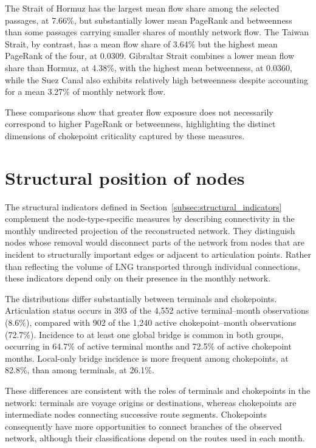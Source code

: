 \documentclass[pdftex,12pt,openright,a4paper,oneside]{book}
\begin{document}
The Strait of Hormuz has the largest mean flow share among the selected passages, at 7.66\%, but substantially lower mean PageRank and betweenness than some passages carrying smaller shares of monthly network flow. 
The Taiwan Strait, by contrast, has a mean flow share of 3.64\% but the highest mean PageRank of the four, at 0.0309. Gibraltar Strait combines a lower mean flow share than Hormuz, at 4.38\%, with the highest mean betweenness, at 0.0360, while the Suez Canal also exhibits relatively high betweenness despite accounting for a mean 3.27\% of monthly network flow. 

These comparisons show that greater flow exposure does not necessarily correspond to higher PageRank or betweenness, highlighting the distinct dimensions of chokepoint criticality captured by these measures.

\section{Structural position of nodes}
\label{sec:network_structure}

The structural indicators defined in Section~\ref{subsec:structural_indicators} complement the node-type-specific measures by describing connectivity in the monthly undirected projection of the reconstructed network. 
They distinguish nodes whose removal would disconnect parts of the network from nodes that are incident to structurally important edges or adjacent to articulation points. 
Rather than reflecting the volume of LNG transported through individual connections, these indicators depend only on their presence in the monthly network.

The distributions differ substantially between terminals and chokepoints. Articulation status occurs in 393 of the 4,552 active terminal--month observations (8.6\%), compared with 902 of the 1,240 active chokepoint--month observations (72.7\%). 
Incidence to at least one global bridge is common in both groups, occurring in 64.7\% of active terminal months and 72.5\% of active chokepoint months. 
Local-only bridge incidence is more frequent among chokepoints, at 82.8\%, than among terminals, at 26.1\%.

These differences are consistent with the roles of terminals and chokepoints in the network: 
terminals are voyage origins or destinations, whereas chokepoints are intermediate nodes connecting successive route segments. 
Chokepoints consequently have more opportunities to connect branches of the observed network, although their classifications depend on the routes used in each month. 
\end{document}
